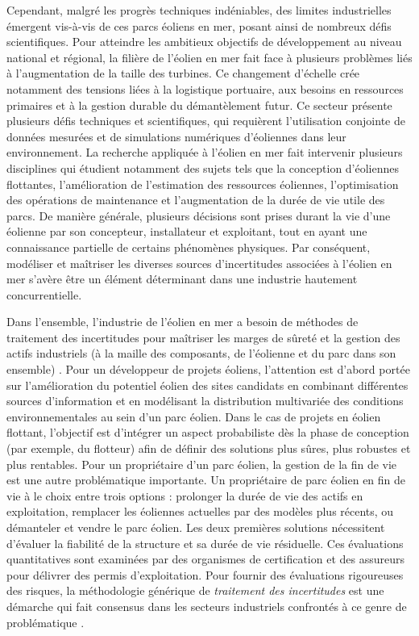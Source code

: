 Cependant, malgré les progrès techniques indéniables, des limites industrielles émergent vis-à-vis de ces parcs éoliens en mer, posant ainsi de nombreux défis scientifiques. 
Pour atteindre les ambitieux objectifs de développement au niveau national et régional, la filière de l'éolien en mer fait face à plusieurs problèmes liés à l'augmentation de la taille des turbines.
Ce changement d'échelle crée notamment des tensions liées à la logistique portuaire, aux besoins en ressources primaires et à la gestion durable du démantèlement futur. 
Ce secteur présente plusieurs défis techniques et scientifiques, qui requièrent l'utilisation conjointe de données mesurées et de simulations numériques d'éoliennes dans leur environnement. 
La recherche appliquée à l'éolien en mer fait intervenir plusieurs disciplines qui étudient notamment des sujets tels que la conception d'éoliennes flottantes, l'amélioration de l'estimation des ressources éoliennes, l'optimisation des opérations de maintenance et l'augmentation de la durée de vie utile des parcs. 
De manière générale, plusieurs décisions sont prises durant la vie d'une éolienne par son concepteur, installateur et exploitant, tout en ayant une connaissance partielle de certains phénomènes physiques. 
Par conséquent, modéliser et maîtriser les diverses sources d'incertitudes associées à l'éolien en mer s'avère être un élément déterminant dans une industrie hautement concurrentielle.

Dans l'ensemble, l'industrie de l'éolien en mer a besoin de méthodes de traitement des incertitudes pour maîtriser les marges de sûreté et la gestion des actifs industriels (à la maille des composants, de l'éolienne et du parc dans son ensemble) \citep{OWT_review_2016}. 
Pour un développeur de projets éoliens, l'attention est d'abord portée sur l'amélioration du potentiel éolien des sites candidats en combinant différentes sources d'information et en modélisant la distribution multivariée des conditions environnementales au sein d'un parc éolien. 
Dans le cas de projets en éolien flottant, l'objectif est d'intégrer un aspect probabiliste dès la phase de conception (par exemple, du flotteur) afin de définir des solutions plus sûres, plus robustes et plus rentables. 
Pour un propriétaire d'un parc éolien, la gestion de la fin de vie est une autre problématique importante. 
Un propriétaire de parc éolien en fin de vie à le choix entre trois options : prolonger la durée de vie des actifs en exploitation, remplacer les éoliennes actuelles par des modèles plus récents, ou démanteler et vendre le parc éolien. 
Les deux premières solutions nécessitent d'évaluer la fiabilité de la structure et sa durée de vie résiduelle. Ces évaluations quantitatives sont examinées par des organismes de certification et des assureurs pour délivrer des permis d'exploitation. 
Pour fournir des évaluations rigoureuses des risques, la méthodologie générique de \textit{traitement des incertitudes} est une démarche qui fait consensus dans les secteurs industriels confrontés à ce genre de problématique \citep{rocquigny_2008}.


